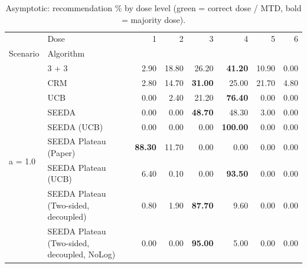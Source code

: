 \begin{table}[H]
\centering
\caption{Asymptotic: recommendation \% by dose level (green = correct dose / MTD, bold = majority dose).}
\label{tab:asym_rec_by_dose}
\begin{tabular}{llrrrrrr}
\toprule
 & Dose & 1 & 2 & 3 & 4 & 5 & 6 \\
Scenario & Algorithm &  &  &  &  &  &  \\
\midrule
\multirow[c]{9}{*}{a = 1.0} & 3 + 3 & 2.90 & 18.80 & {\cellcolor[HTML]{C8E6C9}} 26.20 & \bfseries 41.20 & 10.90 & 0.00 \\
 & CRM & 2.80 & 14.70 & {\cellcolor[HTML]{C8E6C9}} \bfseries 31.00 & 25.00 & 21.70 & 4.80 \\
 & UCB & 0.00 & 2.40 & {\cellcolor[HTML]{C8E6C9}} 21.20 & \bfseries 76.40 & 0.00 & 0.00 \\
 & SEEDA & 0.00 & 0.00 & {\cellcolor[HTML]{C8E6C9}} \bfseries 48.70 & 48.30 & 3.00 & 0.00 \\
 & SEEDA (UCB) & 0.00 & 0.00 & {\cellcolor[HTML]{C8E6C9}} 0.00 & \bfseries 100.00 & 0.00 & 0.00 \\
 & SEEDA Plateau (Paper) & \bfseries 88.30 & 11.70 & {\cellcolor[HTML]{C8E6C9}} 0.00 & 0.00 & 0.00 & 0.00 \\
 & SEEDA Plateau (UCB) & 6.40 & 0.10 & {\cellcolor[HTML]{C8E6C9}} 0.00 & \bfseries 93.50 & 0.00 & 0.00 \\
 & SEEDA Plateau (Two-sided, decoupled) & 0.80 & 1.90 & {\cellcolor[HTML]{C8E6C9}} \bfseries 87.70 & 9.60 & 0.00 & 0.00 \\
 & SEEDA Plateau (Two-sided, decoupled, NoLog) & 0.00 & 0.00 & {\cellcolor[HTML]{C8E6C9}} \bfseries 95.00 & 5.00 & 0.00 & 0.00 \\
\bottomrule
\end{tabular}
\end{table}
